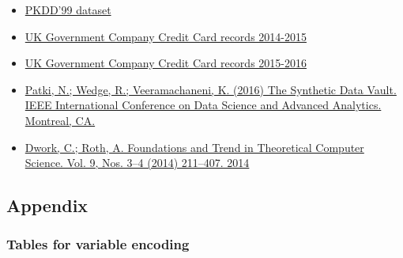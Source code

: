 \documentclass[]{article}
\begin{document}
\begin{itemize}
\tightlist
\item
  \href{http://lisp.vse.cz/pkdd99/berka.htm}{PKDD'99 dataset}
\item
  \href{https://www.europeandataportal.eu/data/en/dataset/corporate-credit-card-transaction-2014-15}{UK
  Government Company Credit Card records 2014-2015}
\item
  \href{https://www.europeandataportal.eu/data/en/dataset/corporate-credit-card-transactions-2015-16}{UK
  Government Company Credit Card records 2015-2016}
\item
  \href{http://dai.lids.mit.edu/pdf/SDV2.pdf}{Patki, N.; Wedge, R.;
  Veeramachaneni, K. (2016) The Synthetic Data Vault. IEEE International
  Conference on Data Science and Advanced Analytics. Montreal, CA.}
\item
  \href{https://www.cis.upenn.edu/~aaroth/Papers/privacybook.pdf}{Dwork,
  C.; Roth, A. Foundations and Trend in Theoretical Computer Science.
  Vol. 9, Nos. 3--4 (2014) 211--407. 2014}
\end{itemize}




\subsection{Appendix}\label{appendix}

\subsubsection{Tables for variable
encoding}\label{tables-for-variable-encoding}
\end{document}
